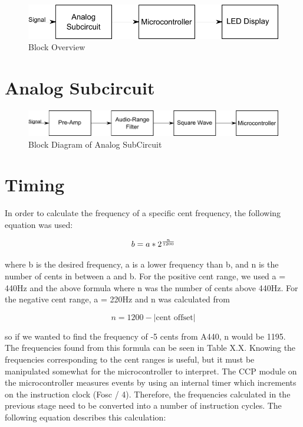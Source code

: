 \documentclass[12pt]{article}
\begin{document}
\begin{figure}[H]
\centering
	\includegraphics[width=6in]{"Block Overview"}
	\caption{Block Overview}
	\label{block_overview} 
\end{figure}

\section{Analog Subcircuit}
\begin{figure}[H]
\centering
	\includegraphics[width=6in]{"Analog Subcircuit"}
	\caption{Block Diagram of Analog SubCircuit}
	\label{analog_block} 
\end{figure}

\section{Timing}

In order to calculate the frequency of a specific cent frequency, the following equation was used:

\begin{equation}
b = a * 2^{n \over 1200}
\end{equation}

where b is the desired frequency, a is a lower frequency than b, and n is the number of cents in between
a and b. For the positive cent range, we used a = 440Hz and the above formula where n was the number
of cents above 440Hz. For the negative cent range, a = 220Hz and n was calculated from

\begin{equation}
n = 1200 - |\mbox{cent offset}|
\end{equation}

so if we wanted to find the frequency of -5 cents from A440, n would be 1195. The frequencies found
from this formula can be seen in Table X.X. Knowing the frequencies corresponding to the cent ranges
is useful, but it must be manipulated somewhat for the microcontroller to interpret. The CCP module
on the microcontroller measures events by using an internal timer which increments on the instruction
clock (Fosc / 4). Therefore, the frequencies calculated in the previous stage need to be converted into a
number of instruction cycles. The following equation describes this calculation:
\end{document}
